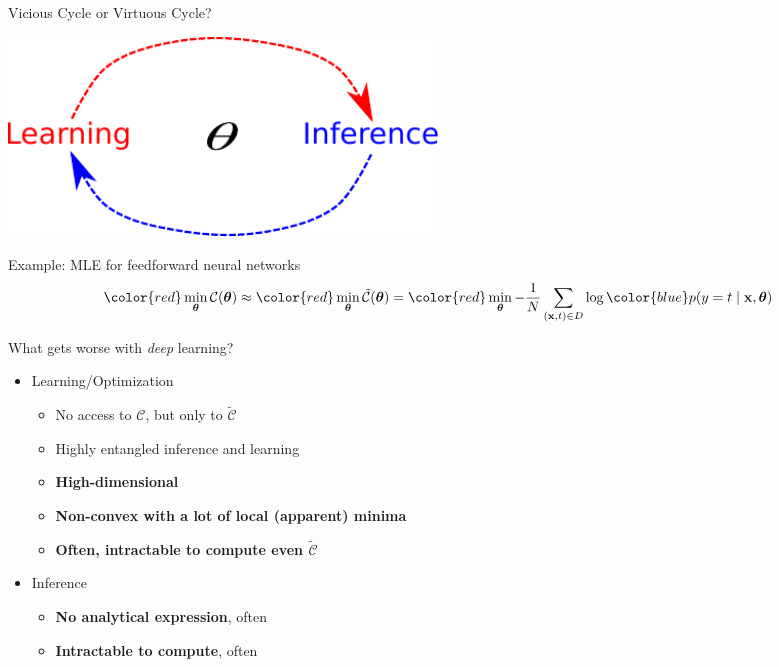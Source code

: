 \documentclass{beamer}
\newcommand{\vect}[1]{\mathbf{#1}}
\newcommand{\vects}[1]{\boldsymbol{#1}}
\newcommand{\vx}[0]{\vect{x}}
\newcommand{\TT}[0]{{\vects{\theta}}}
\newcommand{\CC}[0]{\mathcal{C}}
\newcommand{\tred}[1]{\textcolor{red}{#1}}
\newcommand{\tblue}[1]{\textcolor{blue}{#1}}
\begin{document}
\begin{frame}{Vicious Cycle or Virtuous Cycle?}

        \centering
        \includegraphics[width=0.5\textwidth]{vicious_cycle.pdf}

    \vfill
    \raggedright
    Example: MLE for feedforward neural networks
    \begin{align*}
        {\color{red} \min_{\TT} \CC(\TT)} \approx 
        {\color{red} \min_{\TT} \tilde{\CC}(\TT)} =
        {\color{red} \min_{\TT} -\frac{1}{N}\sum_{\left(\vx,t\right) \in D}
        \log {\color{blue}p(y=t \mid \vx, \TT)}}
    \end{align*}

\end{frame}

\begin{frame}{What gets worse with \emph{deep} learning?}
    \begin{itemize}
        \item Learning/Optimization 
            \begin{itemize}
                \item No access to $\CC$, but only to $\tilde{\CC}$
                \item Highly entangled inference and learning
                \item \textbf{High-dimensional}
                \item \textbf{Non-convex with a lot of local (apparent) minima}
                \item \textbf{Often, intractable to compute
                    even $\tilde{\CC}$}
            \end{itemize}
    \end{itemize}

    \begin{itemize}
        \item Inference
            \begin{itemize}
                \item \textbf{No analytical expression}, often
                \item \textbf{Intractable to compute}, often
            \end{itemize}
    \end{itemize}
\end{frame}
\end{document}
